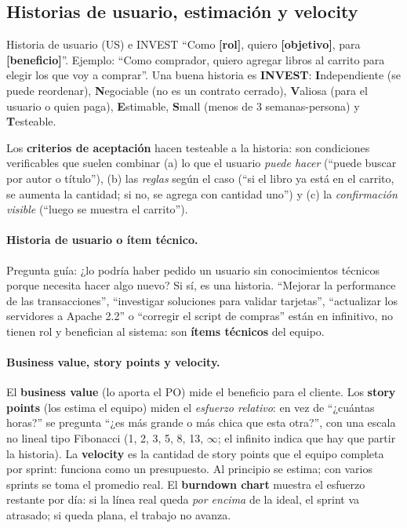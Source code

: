 \documentclass[11pt,a4paper]{article}
\begin{document}
\subsection{Historias de usuario, estimación y velocity}
\begin{defbox}{Historia de usuario (US) e INVEST}
``Como \textbf{[rol]}, quiero \textbf{[objetivo]}, para \textbf{[beneficio]}''. Ejemplo: ``Como comprador,
quiero agregar libros al carrito para elegir los que voy a comprar''. Una buena historia es \textbf{INVEST}:
\textbf{I}ndependiente (se puede reordenar), \textbf{N}egociable (no es un contrato cerrado),
\textbf{V}aliosa (para el usuario o quien paga), \textbf{E}stimable, \textbf{S}mall (menos de 3
semanas-persona) y \textbf{T}esteable.
\end{defbox}
Los \textbf{criterios de aceptación} hacen testeable a la historia: son condiciones verificables que suelen
combinar (a) lo que el usuario \emph{puede hacer} (``puede buscar por autor o título''), (b) las
\emph{reglas} según el caso (``si el libro ya está en el carrito, se aumenta la cantidad; si no, se agrega con
cantidad uno'') y (c) la \emph{confirmación visible} (``luego se muestra el carrito'').

\paragraph{Historia de usuario o ítem técnico.} Pregunta guía: ¿lo podría haber pedido un usuario sin
conocimientos técnicos porque necesita hacer algo nuevo? Si sí, es una historia. ``Mejorar la performance de
las transacciones'', ``investigar soluciones para validar tarjetas'', ``actualizar los servidores a Apache
2.2'' o ``corregir el script de compras'' están en infinitivo, no tienen rol y benefician al sistema: son
\textbf{ítems técnicos} del equipo.

\paragraph{Business value, story points y velocity.} El \textbf{business value} (lo aporta el PO) mide el
beneficio para el cliente. Los \textbf{story points} (los estima el equipo) miden el \emph{esfuerzo relativo}:
en vez de ``¿cuántas horas?'' se pregunta ``¿es más grande o más chica que esta otra?'', con una escala no
lineal tipo Fibonacci (1, 2, 3, 5, 8, 13, $\infty$; el infinito indica que hay que partir la historia). La
\textbf{velocity} es la cantidad de story points que el equipo completa por sprint: funciona como un
presupuesto. Al principio se estima; con varios sprints se toma el promedio real. El \textbf{burndown chart}
muestra el esfuerzo restante por día: si la línea real queda \emph{por encima} de la ideal, el sprint va
atrasado; si queda plana, el trabajo no avanza.
\end{document}
